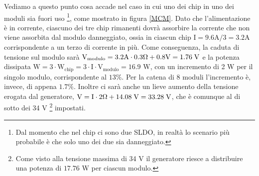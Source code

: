 Vediamo a questo punto cosa accade nel caso in cui uno dei chip in uno dei moduli sia fuori uso
\footnote{
  Dal momento che nel chip ci sono due SLDO, in realtà lo scenario più probabile è che solo uno dei due sia danneggiato.
},
come mostrato in figura \ref{MCM}.
Dato che l'alimentazione è in corrente, ciascuno dei tre chip rimanenti dovrà assorbire la corrente che non viene assorbita dal modulo danneggiato, ossia in ciascun chip $\mathrm{I = 9.6A / 3 = 3.2 A}$ corrispondente a un terzo di corrente in più.
Come conseguenza, la caduta di tensione sul modulo sarà $\mathrm{V_{modulo} = 3.2 A \cdot 0.3 \Omega + 0.8 V = 1.76 \rm \; V}$ e la potenza dissipata $\mathrm{W = 3 \cdot W_{chip} = 3 \cdot I \cdot V_{modulo} = 16.9}$ W, con un incremento di 2 W per il singolo modulo, corrispondente al $13 \%$.
Per la catena di 8 moduli l'incremento è, invece, di appena $1.7\%$.
Inoltre ci sarà anche un lieve aumento della tensione erogata dal generatore, $\mathrm{V=I \cdot 2 \Omega +14.08 \rm \; V=33.28 \rm \; V}$, che è comunque al di sotto dei 34 V
\footnote{
  Come visto alla tensione massima di  34 V il generatore riesce a distribuire una potenza di $17.76$ W per ciascun modulo.
}
impostati.


